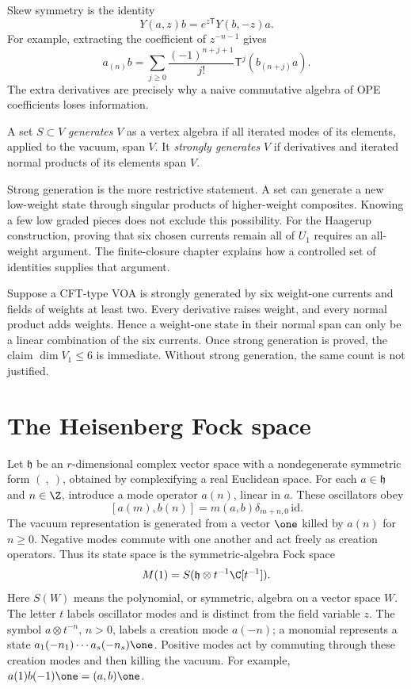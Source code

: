Skew symmetry is the identity
\begin{equation}
 Y(a,z)b=e^{z\mathsf T}Y(b,-z)a.
 \label{eq:voa-skew}
\end{equation}
For example, extracting the coefficient of $z^{-n-1}$ gives
\[
 a_{(n)}b=\sum_{j\ge0}\frac{(-1)^{n+j+1}}{j!}
          \mathsf T^j(b_{(n+j)}a).
\]
The extra derivatives are precisely why a naive commutative algebra
of OPE coefficients loses information.

\begin{definition}
A set $S\subset V$ \emph{generates} $V$ as a vertex algebra if all
iterated modes of its elements, applied to the vacuum, span $V$.
It \emph{strongly generates} $V$ if derivatives and iterated
normal products of its elements span $V$.
\end{definition}

Strong generation is the more restrictive statement. A set can
generate a new low-weight state through singular products of
higher-weight composites. Knowing a few low graded pieces does not
exclude this possibility. For the Haagerup construction, proving that
six chosen currents remain all of $U_1$ requires an all-weight
argument. The finite-closure chapter explains how a controlled set
of identities supplies that argument.

\begin{example}
Suppose a CFT-type VOA is strongly generated by six weight-one
currents and fields of weights at least two. Every derivative raises
weight, and every normal product adds weights. Hence a weight-one
state in their normal span can only be a linear combination of the
six currents. Once strong generation is proved, the claim
$\dim V_1\le6$ is immediate. Without strong generation, the same
count is not justified.
\end{example}

\section{The Heisenberg Fock space}

Let $\mathfrak h$ be an $r$-dimensional complex vector space with a
nondegenerate symmetric form $(\ ,\ )$, obtained by complexifying a
real Euclidean space. For each $a\in\mathfrak h$ and $n\in\Z$,
introduce a mode operator $a(n)$, linear in $a$. These oscillators obey
\[
 [a(m),b(n)]=m(a,b)\delta_{m+n,0}\,\mathrm{id}.
\]
The vacuum representation is generated from a vector $\one$ killed
by $a(n)$ for $n\ge0$. Negative modes commute with one another
and act freely as creation operators. Thus its state space is the
symmetric-algebra Fock space
\[
 M(1)=S(\mathfrak h\otimes t^{-1}\C[t^{-1}]).
\]
Here $S(W)$ means the polynomial, or symmetric, algebra on a vector
space $W$. The letter $t$ labels oscillator modes and is distinct
from the field variable $z$. The symbol $a\otimes t^{-n}$, $n>0$,
labels a creation mode $a(-n)$; a monomial represents a state
$a_1(-n_1)\cdots a_s(-n_s)\one$.
Positive modes act by commuting through these creation modes and
then killing the vacuum. For example,
$a(1)b(-1)\one=(a,b)\one$.

